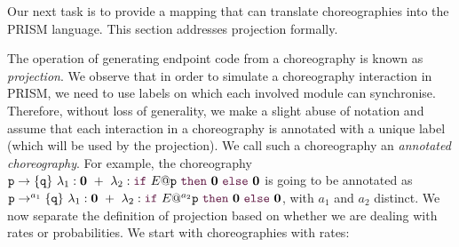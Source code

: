 Our next task is to provide a mapping that can translate
choreographies into the PRISM language. This section addresses
projection formally.

  The operation of generating
endpoint code from a choreography is known as {\em
  projection}. 
We observe that in order to simulate a choreography interaction in
PRISM, we need to use labels on which each involved module can
synchronise. Therefore, without loss of generality, we make a slight
abuse of notation and assume that each interaction in a choreography
is annotated with a unique label (which will be used by the
projection). We call such a choreography an {\em annotated
  choreography}. For example, the choreography
$\interactBase{p}{q}\ \lambda_1: \CEnd \ +\ \lambda_2: \ifTE
  {E}{p}{\CEnd}{\CEnd}$ is going to be annotated as
  $\interactBasel{p}{a_1}{q}\ \lambda_1: \CEnd \ +\ \lambda_2: \ifTEl
    {E}{a_2}{p}{\CEnd}{\CEnd}$, with $a_1$ and $a_2$ distinct.
We now separate the definition of projection based on whether we
are dealing with rates or probabilities.  We start with choreographies 
with rates: 
% 
